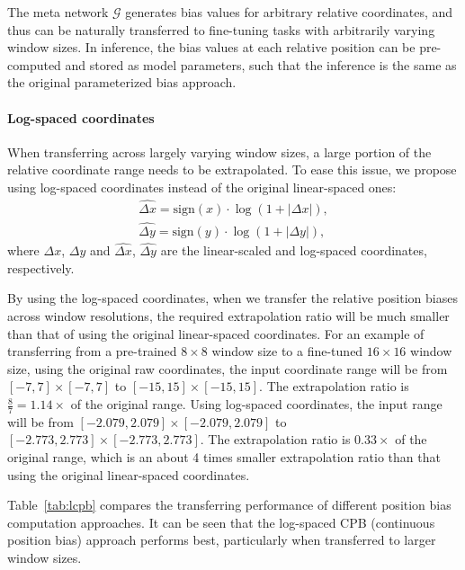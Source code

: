 \documentclass[10pt,twocolumn,letterpaper]{article}
\begin{document}
The meta network $\mathcal{G}$ generates bias values for arbitrary relative coordinates, and thus can be naturally transferred to fine-tuning tasks with arbitrarily varying window sizes. In inference, the bias values at each relative position can be pre-computed and stored as model parameters, such that the inference is the same as the original parameterized bias approach.

\paragraph{Log-spaced coordinates} 

When transferring across largely varying window sizes, a large portion of the relative coordinate range needs to be extrapolated. To ease this issue, we propose using log-spaced coordinates instead of the original linear-spaced ones:
\begin{equation}
\begin{aligned}
\label{eq.log_coord}
    \widehat{\Delta x} = \text{sign}(x) \cdot \log(1+|\Delta x|), \\
    \widehat{\Delta y} = \text{sign}(y) \cdot \log(1+|\Delta y|),
\end{aligned}
\end{equation}
where $\Delta x$, $\Delta y$ and $\widehat{\Delta x}$, $\widehat{\Delta y}$ are the linear-scaled and log-spaced coordinates, respectively.

By using the log-spaced coordinates, when we transfer the relative position biases across window resolutions, the required extrapolation ratio will be much smaller than that of using the original linear-spaced coordinates. For an example of transferring from a pre-trained $8\times 8$ window size to a fine-tuned $16\times 16$ window size, using the original raw coordinates, the input coordinate range will be from $[-7, 7]\times [-7, 7]$ to $[-15, 15]\times [-15, 15]$. The extrapolation ratio is $\frac{8}{7}=1.14\times$ of the original range. Using log-spaced coordinates, the input range will be from $[-2.079, 2.079]\times [-2.079, 2.079]$ to $[-2.773, 2.773]\times [-2.773, 2.773]$. The extrapolation ratio is $0.33\times$ of the original range, which is an about 4 times smaller extrapolation ratio than that using the original linear-spaced coordinates.

Table~\ref{tab:lcpb} compares the transferring performance of different position bias computation approaches. It can be seen that the log-spaced CPB (continuous position bias) approach performs best, particularly when transferred to larger window sizes.
\end{document}
